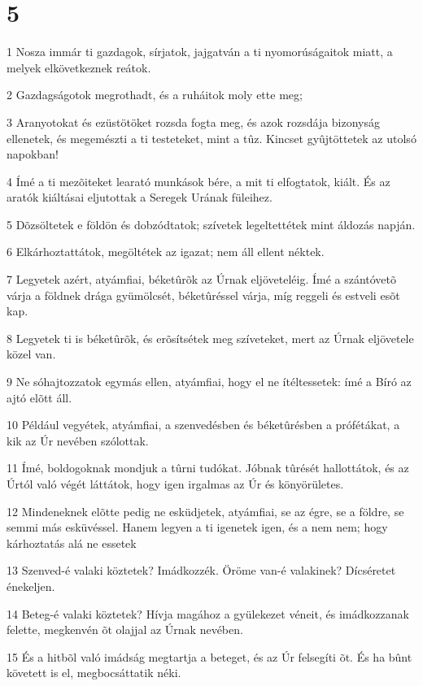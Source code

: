 \chapter{5}

\par 1 Nosza immár ti gazdagok, sírjatok, jajgatván a ti nyomorúságaitok miatt, a melyek elkövetkeznek reátok.
\par 2 Gazdagságotok megrothadt, és a ruháitok moly ette meg;
\par 3 Aranyotokat és ezüstötöket rozsda fogta meg, és azok rozsdája bizonyság ellenetek, és megemészti a ti testeteket, mint a tûz. Kincset gyûjtöttetek az utolsó napokban!
\par 4 Ímé a ti mezõiteket learató munkások bére, a mit ti elfogtatok, kiált. És az aratók kiáltásai eljutottak a Seregek Urának füleihez.
\par 5 Dõzsöltetek e földön és dobzódtatok; szívetek legeltettétek mint  áldozás napján.
\par 6 Elkárhoztattátok, megöltétek az igazat; nem áll ellent néktek.
\par 7 Legyetek azért, atyámfiai, béketûrõk az Úrnak eljöveteléig. Ímé a szántóvetõ várja a földnek drága gyümölcsét, béketûréssel várja, míg reggeli és estveli esõt kap.
\par 8 Legyetek ti is béketûrõk, és erõsítsétek meg szíveteket, mert az Úrnak eljövetele közel van.
\par 9 Ne sóhajtozzatok egymás ellen, atyámfiai, hogy el ne ítéltessetek: ímé a Bíró az ajtó elõtt áll.
\par 10 Például vegyétek, atyámfiai, a szenvedésben és béketûrésben a prófétákat, a kik az Úr nevében szólottak.
\par 11 Ímé, boldogoknak mondjuk a tûrni tudókat. Jóbnak tûrését hallottátok, és az Úrtól való végét láttátok, hogy igen irgalmas az Úr és könyörületes.
\par 12 Mindeneknek elõtte pedig ne esküdjetek, atyámfiai, se az égre, se a földre, se semmi más esküvéssel. Hanem legyen a ti igenetek igen, és a nem nem; hogy kárhoztatás alá ne essetek
\par 13 Szenved-é valaki köztetek? Imádkozzék. Öröme van-é valakinek?  Dícséretet énekeljen.
\par 14 Beteg-é valaki köztetek? Hívja magához a gyülekezet véneit, és imádkozzanak felette, megkenvén õt olajjal az Úrnak nevében.
\par 15 És a hitbõl való imádság megtartja a beteget, és az Úr felsegíti õt. És ha bûnt követett is el, megbocsáttatik néki.
